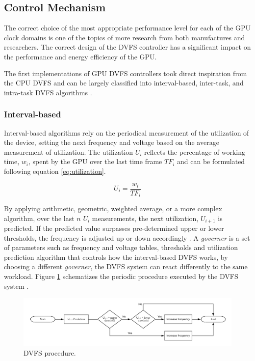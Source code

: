 \subsection{Control Mechanism}

The correct choice of the most appropriate performance level for each of the GPU clock domains is one of the topics of more research from both manufactures and researchers. The correct design of the DVFS controller has a significant impact on the performance and energy efficiency of the GPU.

The first implementations of GPU DVFS controllers took direct inspiration from the CPU DVFS and can be largely classified into interval-based, inter-task, and intra-task DVFS algorithms \cite{boyer_improving_2013}. 

\subsubsection{Interval-based}

Interval-based algorithms rely on the periodical measurement of the utilization of the device, setting the next frequency and voltage based on the average measurement of utilization. The utilization $U_{i}$ reflects the percentage of working time, $w_{i}$, spent by the GPU over the last time frame  $TF_{i}$ and can be formulated following equation \ref{eq:utilization}.

\begin{equation}
    U_i=\frac{w_i}{TF_i}
    \label{eq:utilization}
\end{equation}

By applying arithmetic, geometric, weighted average, or a more complex algorithm, over the last $n$ $U_{i}$ measurements,  the next utilization, $U_{i+1}$ is predicted. If the predicted value surpasses pre-determined upper or lower thresholds, the frequency is adjusted up or down accordingly \cite{seongki_gpgpu-perf:_2015}. 
A \textit{governer} is a set of parameters such as frequency and voltage tables, thresholds and utilization prediction algorithm that controls how the interval-based DVFS works, by choosing a different \textit{governer}, the DVFS system can react differently to the same workload. Figure \ref{fig:DVFSprocedure} schematizes the periodic procedure executed by the DVFS system \cite{seongki_gpgpu-perf:_2015}. 

\begin{figure}[!htb]
  \centering
  \includegraphics[width=1\textwidth]{Figures/StateArt/DVFSprogram.png}
  \caption[Controller]{DVFS procedure.}
  \label{fig:DVFSprocedure}
\end{figure}

